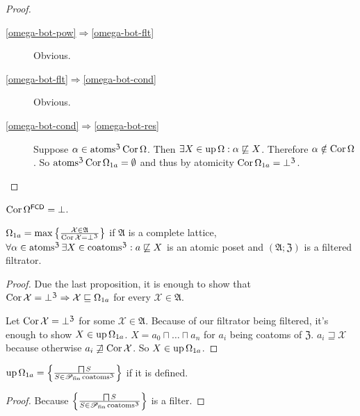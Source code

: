 \begin{proof}
~
\begin{description}
\item[\ref{omega-bot-pow}$\Rightarrow$\ref{omega-bot-flt}]
  Obvious.
\item[\ref{omega-bot-flt}$\Rightarrow$\ref{omega-bot-cond}]
  Obvious.
\item[\ref{omega-bot-cond}$\Rightarrow$\ref{omega-bot-res}]
  Suppose $\alpha \in \operatorname{atoms}^{\mathfrak{Z}} \operatorname{Cor} \Omega$. Then
  $\exists X \in \operatorname{up} \Omega : \alpha \not\sqsubseteq X$.
  Therefore $\alpha \notin \operatorname{Cor} \Omega$. So $\operatorname{atoms}^{\mathfrak{Z}}
  \operatorname{Cor} \Omega_{1 a} = \emptyset$ and thus by atomicity $\operatorname{Cor}
  \Omega_{1 a} = \bot^{\mathfrak{Z}}$.
\end{description}
\end{proof}

\begin{cor}
  $\operatorname{Cor} \Omega^{\mathsf{FCD}} = \bot$.
\end{cor}

\begin{prop}
  $\Omega_{1 a} = \max \left\{ \frac{ \mathcal{X} \in \mathfrak{A} }{
  \operatorname{Cor} \mathcal{X} = \bot^{\mathfrak{Z}} }\right\}$ if $\mathfrak{A}$ is
  a complete lattice,
  $\forall \alpha \in
  \operatorname{atoms}^{\mathfrak{Z}} \exists X \in \operatorname{coatoms}^{\mathfrak{Z}}: a
  \not\sqsubseteq X$ is an atomic
  poset and $(\mathfrak{A}; \mathfrak{Z})$ is a filtered filtrator.
\end{prop}

\begin{proof}
  Due the last proposition, it is enough to show that $\operatorname{Cor} \mathcal{X}
  = \bot^{\mathfrak{Z}} \Rightarrow \mathcal{X} \sqsubseteq \Omega_{1 a}$ for
  every $\mathcal{X} \in \mathfrak{A}$.
  
  Let $\operatorname{Cor} \mathcal{X} = \bot^{\mathfrak{Z}}$ for some $\mathcal{X} \in
  \mathfrak{A}$. Because of our filtrator being filtered, it's enough to show
  $X \in \operatorname{up} \Omega_{1 a}$. $X = a_0 \sqcap \ldots \sqcap a_n$ for $a_i$
  being coatoms of $\mathfrak{Z}$. $a_i \sqsupseteq \mathcal{X}$ because
  otherwise $a_i \not\sqsupseteq \operatorname{Cor} \mathcal{X}$. So $X
  \in \operatorname{up} \Omega_{1 a}$.
\end{proof}

\begin{prop}
  $\operatorname{up} \Omega_{1a} = \left\{ \frac{ \bigsqcap S }{ S \in
  \mathscr{P}_{\operatorname{fin}} \operatorname{coatoms}^{\mathfrak{Z}} }\right\}$
  if it is defined.
\end{prop}

\begin{proof}
  Because $\left\{ \frac{ \bigsqcap S }{ S \in
  \mathscr{P}_{\operatorname{fin}} \operatorname{coatoms}^{\mathfrak{Z}} }\right\}$ is a
  filter.
\end{proof}

